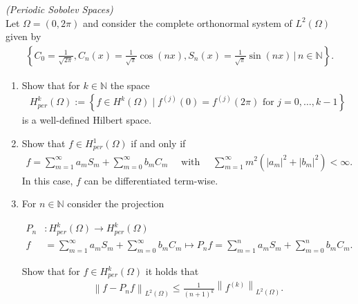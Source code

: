 
\begin{exercise}
\textit{(Periodic Sobolev Spaces)} \\
Let $\Omega=(0,2 \pi)$ and consider the
complete orthonormal system of $L^{2}(\Omega)$ given by
\begin{align*}
  \left\{C_{0}=\frac{1}{\sqrt{2 \pi}}, C_{n}(x)=\frac{1}{\sqrt{\pi}} \cos (n x), S_{n}(x)=\frac{1}{\sqrt{\pi}} \sin (n x) \,\Bigg|\, n \in \mathbb{N}\right\}.
\end{align*}
\begin{enumerate}[label = (\roman*)]
  \item Show that for $k \in \mathbb{N}$ the space
  \begin{align*}
      H_{per}^{k}(\Omega):=\left\{f \in H^{k}(\Omega) \mid f^{(j)}(0)=f^{(j)}(2 \pi) \text { for } j=0, \ldots, k-1\right\}
  \end{align*}
  is a well-defined Hilbert space.
  \item Show that $f \in H_{per}^{1}(\Omega)$ if and only if
  \begin{align*}
      f=\sum_{m=1}^{\infty} a_{m} S_{m}+\sum_{m=0}^{\infty} b_{m} C_{m} \quad \text { with } \quad
      \sum_{m=1}^{\infty} m^{2}\left(\left|a_{m}\right|^{2}+\left|b_{m}\right|^{2}\right)<\infty.
  \end{align*}
  In this case, $f$ can be differentiated \glqq term-wise\grqq.
  \item For $n \in \mathbb{N}$ consider the projection

  \begin{align*}
    P_{n}&: H_{p e r}^{k}(\Omega) \rightarrow H_{p e r}^{k}(\Omega) \\
    f&=\sum_{m=1}^{\infty} a_{m} S_{m}+\sum_{m=0}^{\infty} b_{m} C_{m}
    \mapsto P_{n} f=\sum_{m=1}^{n} a_{m} S_{m}+\sum_{m=0}^{n} b_{m} C_{m}.
  \end{align*}

  Show that for $f \in H_{per}^{k}(\Omega)$ it holds that
  \begin{align*}
  \left\|f-P_{n} f\right\|_{L^{2}(\Omega)} \leq \frac{1}{(n+1)^{k}}\left\|f^{(k)}\right\|_{L^{2}(\Omega)}.
  \end{align*}

\end{enumerate}
\end{exercise}


